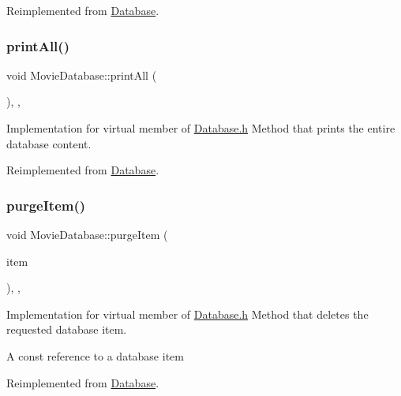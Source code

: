 Reimplemented from \hyperlink{classDatabase_a230225cb341eb23a99a83ef3d1abae53}{Database}.

\mbox{\label{classMovieDatabase_af1e13b6fc0fd7186e98edbe2cf187618}} 
\subsubsection{\texorpdfstring{print\+All()}{printAll()}}
{\footnotesize\ttfamily void Movie\+Database\+::print\+All (\begin{DoxyParamCaption}{ }\end{DoxyParamCaption})\hspace{0.3cm}{\ttfamily [inline]}, {\ttfamily [override]}, {\ttfamily [virtual]}}



Implementation for virtual member of \hyperlink{Database_8h_source}{Database.\+h} Method that prints the entire database content. 



Reimplemented from \hyperlink{classDatabase_afa345da530fd5c8dfe0c978917cd6049}{Database}.

\mbox{\label{classMovieDatabase_ad3ce59d0fa7f64937085e7504bd3b85a}} 
\subsubsection{\texorpdfstring{purge\+Item()}{purgeItem()}}
{\footnotesize\ttfamily void Movie\+Database\+::purge\+Item (\begin{DoxyParamCaption}\item[{\hyperlink{classDatabaseItem}{Database\+Item}}]{item }\end{DoxyParamCaption})\hspace{0.3cm}{\ttfamily [inline]}, {\ttfamily [override]}, {\ttfamily [virtual]}}



Implementation for virtual member of \hyperlink{Database_8h_source}{Database.\+h} Method that deletes the requested database item. 

A const reference to a database item

Reimplemented from \hyperlink{classDatabase_a8f47437526eeec631f1328fab9bbbc75}{Database}.

